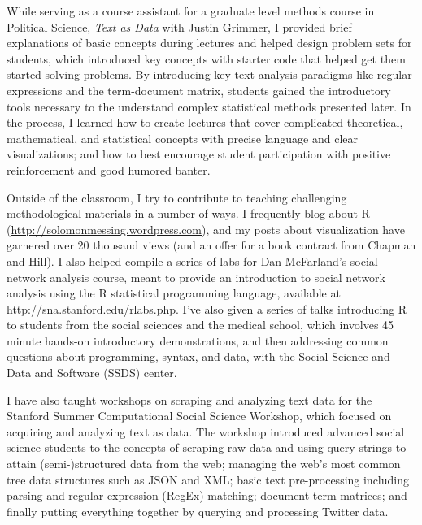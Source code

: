 \documentclass[12pt]{article}
\begin{document}
While serving as a course assistant for a graduate level methods course in Political Science, \emph{Text as Data} with Justin Grimmer, I provided brief explanations of basic concepts during lectures and helped design problem sets for students, which introduced key concepts with starter code that helped get them started solving problems.  By introducing key text analysis paradigms like regular expressions and the term-document matrix, students gained the introductory tools necessary to the understand complex statistical methods presented later.  In the process, I learned how to create lectures that cover complicated theoretical, mathematical, and statistical concepts with precise language and clear visualizations; and how to best encourage student participation with positive reinforcement and good humored banter.

Outside of the classroom, I try to contribute to teaching challenging methodological materials in a number of ways.  I frequently blog about R (\url{http://solomonmessing.wordpress.com}), and my posts about visualization have garnered over 20 thousand views (and an offer for a book contract from Chapman and Hill).  I also helped compile a series of labs for Dan McFarland's social network analysis course, meant to provide an introduction to social network analysis using the R statistical programming language, available at \url{http://sna.stanford.edu/rlabs.php}.  I've also given a series of talks introducing R to students from the social sciences and the medical school, which involves 45 minute hands-on introductory demonstrations, and then addressing common questions about programming, syntax, and data, with the Social Science and Data and Software (SSDS) center.  

I have also taught workshops on scraping and analyzing text data for the Stanford Summer Computational Social Science Workshop, which focused on acquiring and analyzing text as data.  The workshop introduced advanced social science students to the concepts of scraping raw data and using query strings to attain (semi-)structured data from the web; managing the web's most common tree data structures such as JSON and XML; basic text pre-processing including parsing and regular expression (RegEx) matching; document-term matrices; and finally putting everything together by querying and processing Twitter data.  
\end{document}
